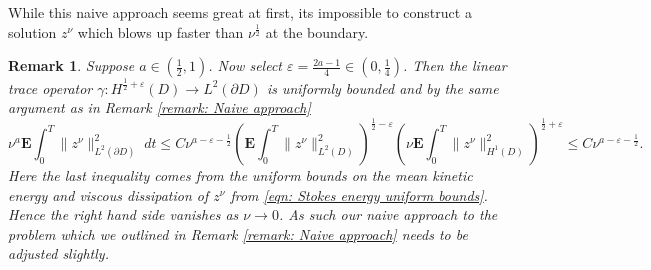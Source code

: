 \documentclass[11pt, reqno]{article}
\newtheorem{remark}[theorem]{Remark}
\def\E{\mathbf{E}}
\begin{document}
While this naive approach seems great at first, its impossible to construct a solution $z^\nu$ which blows up faster than $\nu^{\frac{1}{2}}$ at the boundary.
\begin{remark}\label{remark: boundary convergence}
   Suppose $a \in (\frac{1}{2}, 1)$. Now select $\varepsilon = \frac{2a - 1}{4} \in (0,\frac{1}{4})$. Then the linear trace operator $\gamma: H^{\frac{1}{2}+\varepsilon}(D) \to L^2(\partial D)$ is uniformly bounded and by the same argument as in Remark \ref{remark: Naive approach}
    \[
        \nu^a\E\int_0^T\|z^\nu\|_{L^2(\partial D)}^2\;dt \leq  C \nu^{a - \varepsilon - \frac{1}{2}}(\E\int_0^T\|z^\nu\|_{L^2(D)}^2)^{\frac{1}{2} - \varepsilon}(\nu\E\int_0^T\|z^\nu\|_{H^1(D)}^2)^{\frac{1}{2} + \varepsilon} \leq C\nu^{a-\varepsilon - \frac{1}{2}}.
    \]
    Here the last inequality comes from the uniform bounds on the mean kinetic energy and viscous dissipation of $z^\nu$ from \eqref{eqn: Stokes energy uniform bounds}.
    Hence the right hand side vanishes as $\nu \to 0$. As such our naive approach to the problem which we outlined in Remark \ref{remark: Naive approach} needs to be adjusted slightly.
\end{remark}
\end{document}
